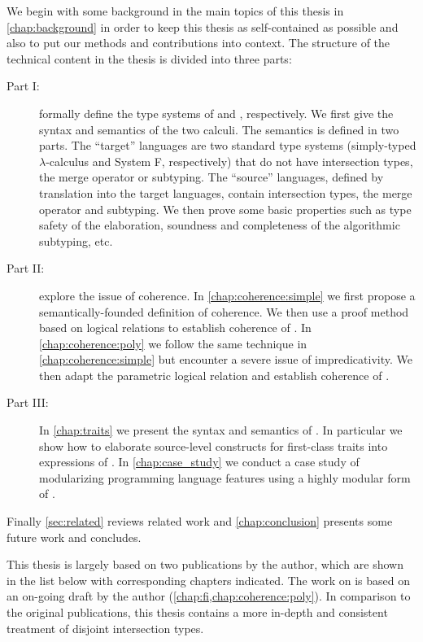 We begin with some background in the main topics of this thesis in
\cref{chap:background} in order to keep this thesis as self-contained as
possible and also to put our methods and contributions into context. The
structure of the technical content in the thesis is divided into three parts:
\begin{description}
\item[Part I:]  formally define the type systems of
  \namee and \fnamee, respectively. We first give the syntax and semantics of
  the two calculi. The semantics is defined in two parts. The ``target''
  languages are two standard type systems (simply-typed $\lambda$-calculus and
  System F, respectively) that do not have intersection types, the merge
  operator or subtyping. The ``source'' languages, defined by translation into
  the target languages, contain intersection types, the merge operator and
  subtyping. We then prove some basic properties such as type safety of
  the elaboration, soundness and completeness of the algorithmic subtyping, etc.
\item[Part II:]  explore the
  issue of coherence. In \cref{chap:coherence:simple} we first propose a
  semantically-founded definition of coherence. We then use a proof method based
  on logical relations to establish coherence of \namee. In
  \cref{chap:coherence:poly} we follow the same technique in
  \cref{chap:coherence:simple} but encounter a severe issue of impredicativity. We
  then adapt the parametric logical relation and establish coherence of \fnamee.
\item[Part III:] In \cref{chap:traits} we present the syntax and semantics of
  \sedel. In particular we show how to elaborate source-level constructs for
  first-class traits into expressions of \fnamee. In \cref{chap:case_study} we
  conduct a case study of modularizing programming language features using a
  highly modular form of \visitor.
\end{description}
Finally \cref{sec:related} reviews related work and \cref{chap:conclusion}
presents some future work and concludes.

This thesis is largely based on two publications by the author, which are shown
in the list below with corresponding chapters indicated. The work on \fnamee is
based on an on-going draft by the author (\cref{chap:fi,chap:coherence:poly}).
In comparison to the original publications, this thesis contains a more in-depth
and consistent treatment of disjoint intersection types.

